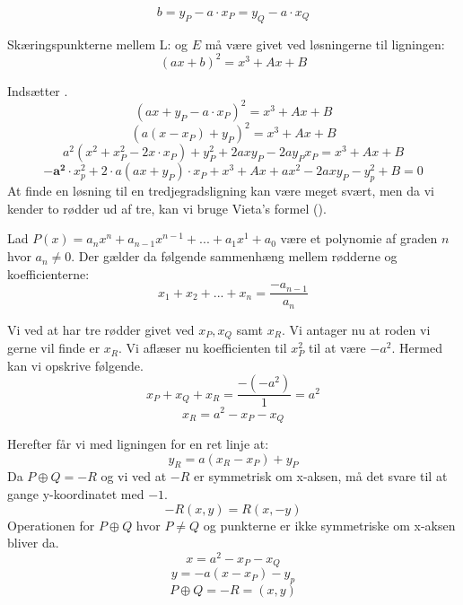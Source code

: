 \begin{equation}\label{eq:constant}
    b=y_P-a \cdot x_P=y_Q -a \cdot x_Q
\end{equation}

Skæringspunkterne mellem L:  og $E$  må være givet ved løsningerne til ligningen:
\begin{equation}
    (ax+b)^2=x^3+Ax+B
\end{equation}

Indsætter .
$$(ax+y_P-a \cdot x_P )^2=x^3+Ax+B$$
$$(a(x - x_P ) + y_P )^2 = x^3 + Ax + B$$
$$a^2(x^2 + x_{P}^2 - 2x\cdot x_P ) + y_{P}^2 + 2axy_{P} - 2ay_{P}x_P = x^3 + Ax + B$$
\begin{equation}\label{eq:poly}
    \boldsymbol{-a^2} \cdot x_p^2 + 2\cdot a(ax+y_P)\cdot x_P + x^3 + Ax + ax^2 -2axy_P -y_p^2+B=0
\end{equation}
At finde en løsning til en tredjegradsligning kan være meget svært, men da vi kender to rødder ud af tre, kan vi bruge Vieta’s formel (\cite{youssefelhousni2018}).

\begin{mdframed}[frametitle={Vietas formel}]
Lad $P(x)=a_{n}x^n + a_{n-1}x^{n-1}+...+a_{1}x^1+ a_0$ være et polynomie af graden $n$ hvor $a_n \neq 0$. Der gælder da følgende sammenhæng mellem rødderne og koefficienterne:
\begin{equation}\label{eq:vietas}
    x_1 + x_2 + ... +x_n = \frac{-a_{n-1}}{a_n}
\end{equation}
\end{mdframed}

Vi ved at  har tre rødder givet ved $x_P, x_Q$ samt $x_R$. Vi antager nu at roden vi gerne vil finde er $x_{R}$. Vi aflæser nu koefficienten til $x_{P}^2$ til at være $-a^2$. Hermed kan vi opskrive følgende.
$$ x_P + x_Q+x_R = \frac{-(-a^2)}{1} = a^2$$
$$ x_R = a^2- x_P - x_Q$$

Herefter får vi med ligningen for en ret linje  at:
$$ y_R = a(x_{R}-x_{P})+y_{P} $$
Da $P\oplus Q=-R$ og vi ved at $-R$ er symmetrisk om x-aksen, må det svare til at gange y-koordinatet med $-1$.
\begin{equation}
    -R(x,y)=R(x,-y)
\end{equation}
Operationen for $P\oplus Q$ hvor $P \neq Q$ og punkterne er ikke symmetriske om x-aksen bliver da.
\begin{equation}
    x = a^2 -x_P -x_Q 
\end{equation}
\begin{equation}
    y = -a(x-x_P)-y_p
\end{equation}
\begin{equation}
    P\oplus Q=-R=(x, y)
\end{equation}

